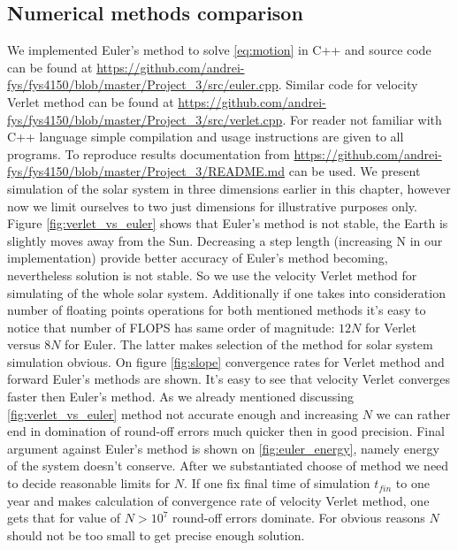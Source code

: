 \documentclass[10pt]{article}
\begin{document}
\subsection{Numerical methods comparison}
We implemented Euler's method to solve \ref{eq:motion} in C++ and source code can be found at \url{https://github.com/andrei-fys/fys4150/blob/master/Project_3/src/euler.cpp}. Similar code for velocity Verlet method can be found at \url{https://github.com/andrei-fys/fys4150/blob/master/Project_3/src/verlet.cpp}. For reader not familiar with C++ language simple compilation and usage instructions are given to all programs. To reproduce results documentation from \url{https://github.com/andrei-fys/fys4150/blob/master/Project_3/README.md} can be used.
We present simulation of the solar system in three dimensions earlier in this chapter, however now we limit ourselves to two just dimensions for illustrative purposes only. 
Figure \ref{fig:verlet_vs_euler} shows that Euler's method is not stable, the Earth is slightly moves away from the Sun. Decreasing a step length (increasing N in our implementation) provide better accuracy of Euler's method becoming, nevertheless solution is not stable. So we use the velocity Verlet method for simulating of the whole solar system. Additionally if one takes into consideration number of floating points operations for both mentioned methods it's easy to notice that number of FLOPS has same order of magnitude: $12N$ for Verlet versus $8N$ for Euler. The latter makes selection of the method for solar system simulation obvious.
On figure \ref{fig:slope} convergence rates for Verlet method and forward Euler's methods are shown. It's easy to see that velocity Verlet converges faster then Euler's method. As we already mentioned discussing \ref{fig:verlet_vs_euler} method not accurate enough and increasing $N$ we can rather end in domination of round-off errors much quicker then in good precision. Final argument against Euler's method is shown on \ref{fig:euler_energy}, namely energy of the system doesn't conserve. After we substantiated choose of method we need to decide reasonable limits for $N$. If one fix final time of simulation $t_{fin}$ to one year and makes calculation of convergence rate of velocity Verlet method, one gets that for value of $N > 10^7$ round-off errors dominate. For obvious reasons $N$ should not be too small to get precise enough solution.

\clearpage
\end{document}
